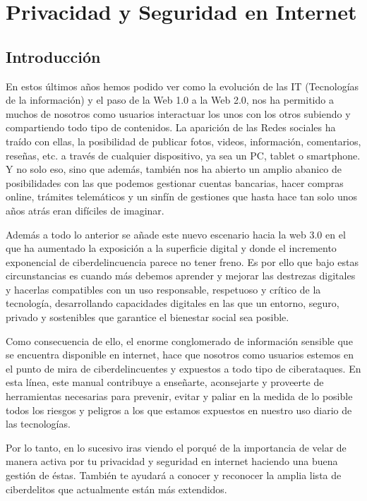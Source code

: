 \documentclass[
  spanish,
  a4paper,
  openany]{book}
\begin{document}
\hypertarget{privacidad-y-seguridad-en-internet}{%
\chapter{Privacidad y Seguridad en Internet}\label{privacidad-y-seguridad-en-internet}}

\hypertarget{introducciuxf3n}{%
\section{Introducción}\label{introducciuxf3n}}

En estos últimos años hemos podido ver como la evolución de las IT (Tecnologías de la información) y el paso de la Web 1.0 a la Web 2.0, nos ha permitido a muchos de nosotros como usuarios interactuar los unos con los otros subiendo y compartiendo todo tipo de contenidos. La aparición de las Redes sociales ha traído con ellas, la posibilidad de publicar fotos, videos, información, comentarios, reseñas, etc. a través de cualquier dispositivo, ya sea un PC, tablet o smartphone. Y no solo eso, sino que además, también nos ha abierto un amplio abanico de posibilidades con las que podemos gestionar cuentas bancarias, hacer compras online, trámites telemáticos y un sinfín de gestiones que hasta hace tan solo unos años atrás eran difíciles de imaginar.

Además a todo lo anterior se añade este nuevo escenario hacia la web 3.0 en el que ha aumentado la exposición a la superficie digital y donde el incremento exponencial de ciberdelincuencia parece no tener freno. Es por ello que bajo estas circunstancias es cuando más debemos aprender y mejorar las destrezas digitales y hacerlas compatibles con un uso responsable, respetuoso y crítico de la tecnología, desarrollando capacidades digitales en las que un entorno, seguro, privado y sostenibles que garantice el bienestar social sea posible.

Como consecuencia de ello, el enorme conglomerado de información sensible que se encuentra disponible en internet, hace que nosotros como usuarios estemos en el punto de mira de ciberdelincuentes y expuestos a todo tipo de ciberataques. En esta línea, este manual contribuye a enseñarte, aconsejarte y proveerte de herramientas necesarias para prevenir, evitar y paliar en la medida de lo posible todos los riesgos y peligros a los que estamos expuestos en nuestro uso diario de las tecnologías.

Por lo tanto, en lo sucesivo iras viendo el porqué de la importancia de velar de manera activa por tu privacidad y seguridad en internet haciendo una buena gestión de éstas. También te ayudará a conocer y reconocer la amplia lista de ciberdelitos que actualmente están más extendidos.
\end{document}
